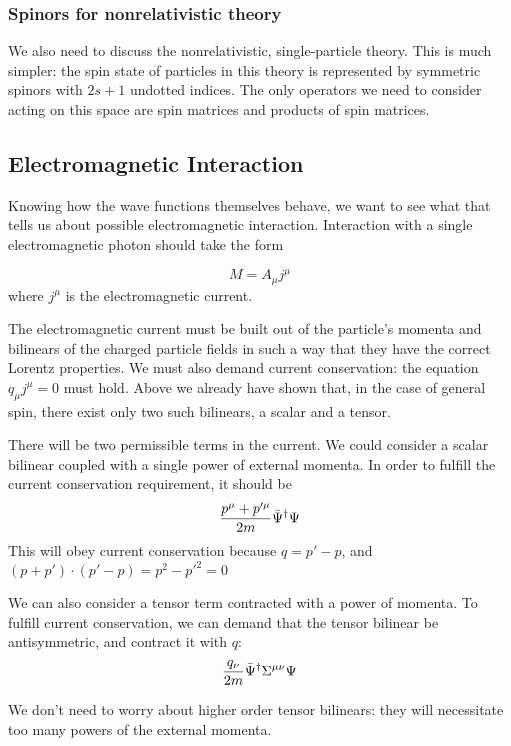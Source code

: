 \subsubsection{Spinors for nonrelativistic theory}

We also need to discuss the nonrelativistic, single-particle theory.  This is much simpler: the spin state of particles in this theory is represented by symmetric spinors with $2s+1$ undotted indices.  The only operators we need to consider acting on this space are spin matrices and products of spin matrices. 

%



\subsection{Electromagnetic Interaction}
Knowing how the wave functions themselves behave, we want to see what that tells us about possible electromagnetic interaction.  Interaction with a single electromagnetic photon should take the form

\[
	M = A_\mu j^\mu 
\]
where $j^\mu$ is the electromagnetic current.


The electromagnetic current must be built out of the particle's momenta and bilinears of the charged particle fields in such a way that they have the correct Lorentz properties.  We must also demand current conservation: the equation $q_\mu j^\mu = 0$ must hold.  Above we already have shown that, in the case of general spin, there exist only two such bilinears, a scalar and a tensor.

There will be two permissible terms in the current.  We could consider a scalar bilinear coupled with a single power of external momenta.  In order to fulfill the current conservation requirement, it should be
\[
	\frac{p^\mu + p'^\mu}{2m} \bar{\Psi}^\dagger \Psi
\]
This will obey current conservation because $q = p' -p$, and $ (p+p')\cdot(p'-p) = p^2-p'^2=0$

We can also consider a tensor term contracted with a power of momenta.  To fulfill current conservation, we can demand that the tensor bilinear be antisymmetric, and contract it with $q$:
\[
	\frac{q_\nu}{2m} \bar{\Psi}^\dagger \Sigma^{\mu\nu} \Psi
\]

We don't need to worry about higher order tensor bilinears: they will necessitate too many powers of the external momenta.

